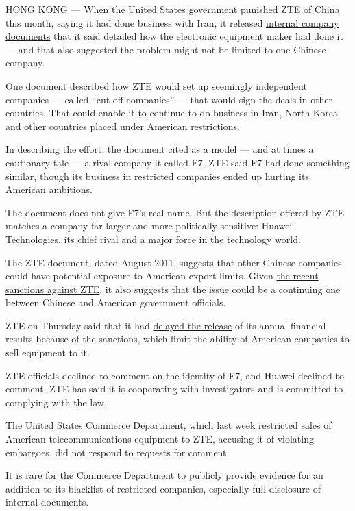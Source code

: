 HONG KONG --- When the United States government punished ZTE of China
this month, saying it had done business with Iran, it released
\href{http://www.bis.doc.gov/index.php/about-bis/newsroom}{internal
company documents} that it said detailed how the electronic equipment
maker had done it --- and that also suggested the problem might not be
limited to one Chinese company.

One document described how ZTE would set up seemingly independent
companies --- called ``cut-off companies'' --- that would sign the deals
in other countries. That could enable it to continue to do business in
Iran, North Korea and other countries placed under American
restrictions.

In describing the effort, the document cited as a model --- and at times
a cautionary tale --- a rival company it called F7. ZTE said F7 had done
something similar, though its business in restricted companies ended up
hurting its American ambitions.

The document does not give F7's real name. But the description offered
by ZTE matches a company far larger and more politically sensitive:
Huawei Technologies, its chief rival and a major force in the technology
world.

The ZTE document, dated August 2011, suggests that other Chinese
companies could have potential exposure to American export limits. Given
\href{http://www.nytimes.com/2016/03/08/technology/us-restricts-sales-to-zte-saying-it-breached-sanctions.html}{the
recent sanctions against ZTE}, it also suggests that the issue could be
a continuing one between Chinese and American government officials.

ZTE on Thursday said that it had
\href{http://www.bbc.com/news/business-35828741}{delayed the release} of
its annual financial results because of the sanctions, which limit the
ability of American companies to sell equipment to it.

ZTE officials declined to comment on the identity of F7, and Huawei
declined to comment. ZTE has said it is cooperating with investigators
and is committed to complying with the law.

The United States Commerce Department, which last week restricted sales
of American telecommunications equipment to ZTE, accusing it of
violating embargoes, did not respond to requests for comment.

It is rare for the Commerce Department to publicly provide evidence for
an addition to its blacklist of restricted companies, especially full
disclosure of internal documents.

